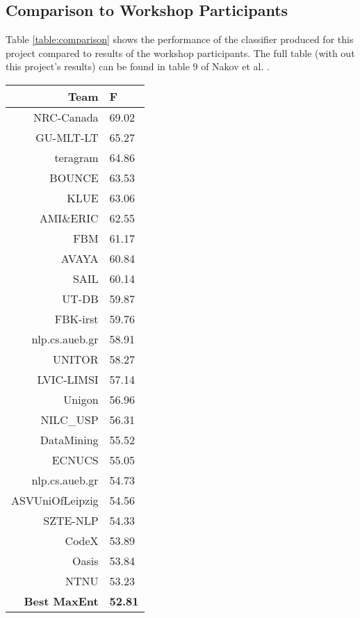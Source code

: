 \documentclass[12pt]{article}
\begin{document}
\subsection{Comparison to Workshop Participants}

Table \ref{table:comparison} shows the performance of the classifier produced
for this project compared to results of the workshop participants. The full
table (with out this project's results) can be found in table 9 of Nakov et al.
\cite{Nakov2013}.


\begin{table}[H]
    \begin{center}
    \begin{tabular}{|r|l|}
        \hline
        Team       & F \\
        \hline
        NRC-Canada & 69.02 \\
        GU-MLT-LT  & 65.27 \\
        teragram   & 64.86 \\
        BOUNCE     & 63.53 \\
        KLUE       & 63.06 \\
        AMI\&ERIC  & 62.55 \\
        FBM        & 61.17 \\
        AVAYA      & 60.84 \\
        SAIL       & 60.14 \\
        UT-DB      & 59.87 \\
        FBK-irst   & 59.76 \\
        nlp.cs.aueb.gr & 58.91 \\
        UNITOR     & 58.27 \\
        LVIC-LIMSI & 57.14 \\
        Unigon     & 56.96 \\
        NILC\_USP  & 56.31 \\
        DataMining & 55.52 \\
        ECNUCS     & 55.05 \\
        nlp.cs.aueb.gr & 54.73 \\
        ASVUniOfLeipzig & 54.56 \\
        SZTE-NLP   & 54.33 \\
        CodeX      & 53.89 \\
        Oasis      & 53.84 \\
        NTNU       & 53.23 \\
        \textbf{Best MaxEnt}& \textbf{52.81} \\

\end{tabular}
\end{center}
\end{table}
\end{document}
